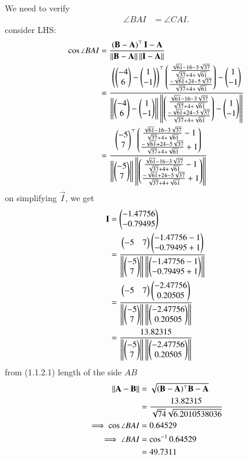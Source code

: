 \documentclass[journal,12pt,twocolumn]{IEEEtran}
\theoremstyle{remark}
\begin{document}
We need to verify \begin{align}\angle BAI &= \angle CAI.\end{align}
consider LHS:
\begin{align} 
\cos{\angle BAI} &= \frac{\left(\mathbf{B} - \mathbf{A}\right)^{\top}\mathbf{I} - \mathbf{A}}{\left\lVert\mathbf{B} - \mathbf{A}\right\rVert \left\lVert \mathbf{I} - \mathbf{A}\right\rVert}\\
 &= \frac{\left(\begin{pmatrix}-4\\6\end{pmatrix} - \begin{pmatrix}1\\-1\end{pmatrix}\right)^{\top}\begin{pmatrix}\frac{{\sqrt{61}-16-3\sqrt{37}}}{\sqrt{37}+4+\sqrt{61}}\\\frac{{-\sqrt{61}+24-5\sqrt{37}}}{\sqrt{37}+4+\sqrt{61}}\end{pmatrix} - \begin{pmatrix}1\\-1\end{pmatrix}}{\left\lVert\begin{pmatrix}-4\\6\end{pmatrix} - \begin{pmatrix}1\\-1\end{pmatrix}\right\rVert \left\lVert \begin{pmatrix}\frac{{\sqrt{61}-16-3\sqrt{37}}}{\sqrt{37}+4+\sqrt{61}}\\\frac{{-\sqrt{61}+24-5\sqrt{37}}}{\sqrt{37}+4+\sqrt{61}}\end{pmatrix} - \begin{pmatrix}1\\-1\end{pmatrix}\right\rVert}\\
 &= \frac{\begin{pmatrix}-5\\7\end{pmatrix}^{\top}\begin{pmatrix}\frac{{\sqrt{61}-16-3\sqrt{37}}}{\sqrt{37}+4+\sqrt{61}}-1\\\frac{{-\sqrt{61}+24-5\sqrt{37}}}{\sqrt{37}+4+\sqrt{61}}+1\end{pmatrix}}{\left\lVert\begin{pmatrix}-5\\7\end{pmatrix}\right\rVert \left\lVert \begin{pmatrix}\frac{{\sqrt{61}-16-3\sqrt{37}}}{\sqrt{37}+4+\sqrt{61}}-1\\\frac{{-\sqrt{61}+24-5\sqrt{37}}}{\sqrt{37}+4+\sqrt{61}}+1\end{pmatrix}\right\rVert}
\end{align}
on simplifying $\vec{I}$, we get
\begin{align}
\mathbf{I} &= \begin{pmatrix}-1.47756\\-0.79495\end{pmatrix}\\
&= \frac{\begin{pmatrix}-5&7\end{pmatrix}\begin{pmatrix}-1.47756-1\\-0.79495+1\end{pmatrix}}{\left\lVert\begin{pmatrix}-5\\7\end{pmatrix}\right\rVert \left\lVert \begin{pmatrix}-1.47756-1\\-0.79495+1\end{pmatrix}\right\rVert}\\
&= \frac{\begin{pmatrix}-5&7\end{pmatrix}\begin{pmatrix}-2.47756\\0.20505\end{pmatrix}}{\left\lVert\begin{pmatrix}-5\\7\end{pmatrix}\right\rVert \left\lVert \begin{pmatrix}-2.47756\\0.20505\end{pmatrix}\right\rVert}\\
&= \frac{13.82315}{\left\lVert\begin{pmatrix}-5\\7\end{pmatrix}\right\rVert \left\lVert\begin{pmatrix}-2.47756\\0.20505\end{pmatrix}\right\rVert}
\end{align}
from (1.1.2.1) length of the side $AB$
\begin{align}
\left\lVert\mathbf{A} - \mathbf{B}\right\rVert &= \sqrt{(\mathbf{B}-\mathbf{A}){^\top}\mathbf{B}-\mathbf{A}}\\
&= \frac{13.82315}{\sqrt{74}\sqrt{6.2010538036}}\\
\implies \cos{\angle BAI} &= 0.64529 \\
\implies \angle BAI &= \cos^{-1}{0.64529}\\
&= 49.7311 \label{eq:angle BAI}
\end{align}
\end{document}
